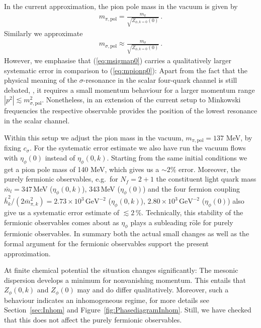 \documentclass[%
reprint,
superscriptaddress,
showpacs,preprintnumbers,
 amsmath,amssymb,
 aps,
prd,
]{revtex4-1}
\def\eq#1{(\ref{#1})}
\def\fig#1{Figure~\ref{#1}}
\def\sec#1{Section~\ref{#1}}
\begin{document}
In the current approximation, the pion pole mass in the vacuum is
given by
%
\begin{align}
  m_{\pi,\text{pol}}=\frac{m_\pi}{\sqrt{Z_{\phi,k=0}(0)}}\,.
  \label{eq:mpionp0}
\end{align}
%
Similarly we approximate
%
\begin{align}
  m_{\sigma,\text{pol}}\approx
  \frac{m_\sigma}{\sqrt{Z_{\phi,k=0}(0)}}\,.
  \label{eq:msigmap0}
\end{align}
%
However, we emphasise that \eq{eq:msigmap0} carries a qualitatively
larger systematic error in comparison to \eq{eq:mpionp0}: Apart from
the fact that the physical meaning of the $\sigma$-resonance in the
scalar four-quark channel is still debated, \cite{Jaffe:1976ig,
  Jaffe:1976ih}, it requires a small momentum behaviour for a larger
momentum range $|p^2| \lesssim m_{\sigma,\text{pol}}^2$. Nonetheless,
in an extension of the current setup to Minkowski frequencies the
respective observable provides the position of the lowest resonance in
the scalar channel.

Within this setup we adjust the pion mass in the vacuum,
$m_{\pi,\textrm{pol}}=137$ MeV, by fixing $c_\sigma$. For the
systematic error estimate we also have run the vacuum flows with
$\eta_{\phi}(0)$ instead of $\eta_{\phi}(0,k)$.  Starting from the
same initial conditions we get a pion pole mass of 140 MeV, which
gives us a $\sim 2\%$ error. Moreover, the purely fermionic
observables, e.g.\ for $N_f=2+1$ the constituent light quark mass
$\bar m_l \!=\! 347$\,MeV ($\eta_{\phi}(0,k)$), 343\,MeV
($\eta_{\phi}(0)$) and the four fermion coupling
$\bar h_k^2/(2\bar m_{\pi,k}^2) \!=\! 2.73 \times 10^3\,
\text{GeV}^{-2}$ ($\eta_{\phi}(0,k)$),
$2.80 \times 10^3\, \text{GeV}^{-2}$ ($\eta_{\phi}(0)$) also give us a
systematic error estimate of $\lesssim 2$\,\%. Technically, this
stability of the fermionic observables comes about as $\eta_{\phi}$
plays a subleading r$\hat{\textrm{o}}$le for purely fermionic
observables. In summary both the actual small changes as well as the
formal argument for the fermionic observables support the present
approximation.

At finite chemical potential the situation changes significantly: The
mesonic dispersion develops a minimum for nonvanishing momentum.
This entails that $Z_\phi(0,k)$ and $Z_\phi(0)$ may and do differ
qualitatively. Moreover, such a behaviour indicates an inhomogeneous
regime, for more details see \sec{sec:Inhom} and
\fig{fig:PhasediagramInhom}. Still, we have checked that this does not
affect the purely fermionic observables.
\end{document}
